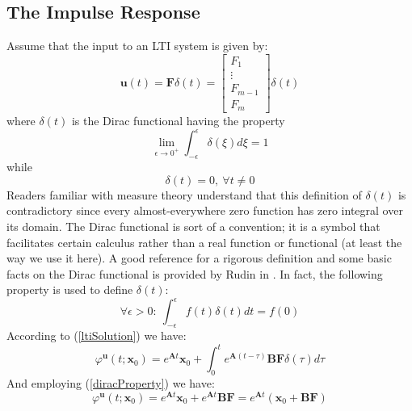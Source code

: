 \documentclass[a4paper,10pt,oneside]{book}
\begin{document}
\subsection{The Impulse Response}
Assume that the input to an LTI system is given by:
\begin{equation}
 \mathbf{u}(t)=\mathbf{F}\delta(t)=\left[ {\begin{array}{c}
 F_1\\
 \vdots\\
 F_{m-1}\\
 F_m\end{array} } \right]\delta(t)
\end{equation}
where $\delta(t)$ is the Dirac functional having the property
\begin{equation}
 \lim_{\epsilon\rightarrow 0^+}\int_{-\epsilon}^{\epsilon}\delta(\xi)d\xi=1
\end{equation}
while
\begin{equation}
 \delta(t)=0,\ \forall t\neq 0
\end{equation}
Readers familiar with measure theory understand that this definition of $\delta(t)$ is contradictory since every almost-everywhere zero function has zero integral over its domain. The Dirac functional is sort of a convention; it is a symbol that facilitates certain calculus rather than a real function or functional (at least the way we use it here). A good reference for a rigorous definition and some basic facts on the Dirac functional is provided by Rudin in \cite[chap. 6]{Rud73}. In fact, the following property is used to define $\delta(t)$:
\begin{equation}
 \forall \epsilon>0:\ \int_{-\epsilon}^{\epsilon}f(t)\delta(t)dt=f(0)\label{diracProperty}
\end{equation}
According to (\ref{ltiSolution}) we have:
\begin{equation}
 \varphi^{\mathbf{u}}(t;\mathbf{x}_0)=e^{\mathbf{A}t}\mathbf{x}_0+\int_0^t e^{\mathbf{A}(t-\tau)}\mathbf{BF}\delta(\tau)d\tau
\end{equation}
And employing (\ref{diracProperty}) we have:
\begin{equation}
 \varphi^{\mathbf{u}}(t;\mathbf{x}_0)=e^{\mathbf{A}t}\mathbf{x}_0+ e^{\mathbf{A}t}\mathbf{BF}=e^{\mathbf{A}t}(\mathbf{x}_0+\mathbf{BF})
\end{equation}
\end{document}
